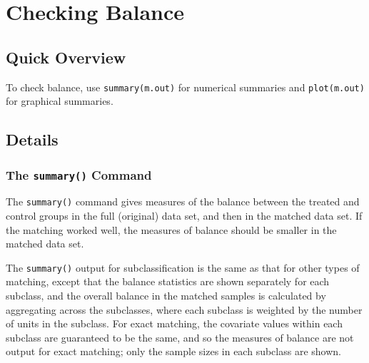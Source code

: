 \section{Checking Balance}
\label{sec:balance}

\subsection{Quick Overview}

To check balance, use \texttt{summary(m.out)} for numerical summaries
and \texttt{plot(m.out)} for graphical summaries.

\subsection{Details}

\subsubsection{The {\tt summary()} Command}

The \texttt{summary()} command gives measures of the balance between
the treated and control groups in the full (original) data set, and
then in the matched data set.  If the matching worked well, the
measures of balance should be smaller in the matched data set.

The \texttt{summary()} output for subclassification is the same as
that for other types of matching, except that the balance statistics
are shown separately for each subclass, and the overall balance in the
matched samples is calculated by aggregating across the subclasses,
where each subclass is weighted by the number of units in the
subclass.  For exact matching, the covariate values within each
subclass are guaranteed to be the same, and so the measures of balance
are not output for exact matching; only the sample sizes in each
subclass are shown.


